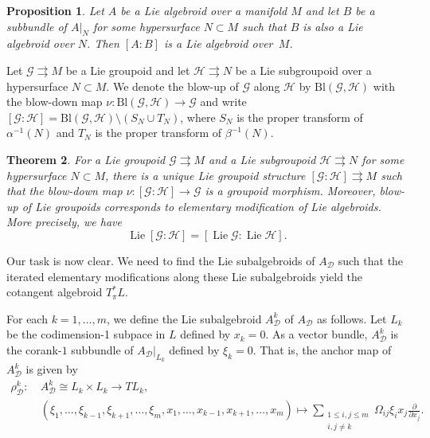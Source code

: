 \documentclass{amsart}
\newtheorem{theorem}{Theorem}[section]
\newtheorem{proposition}[theorem]{Proposition}
\numberwithin{equation}{section}
\newcommand{\cD}{\mathcal{D}}
\newcommand{\cG}{\mathcal{G}}
\newcommand{\cH}{\mathcal{H}}
\newcommand{\Lie}{\operatorname{Lie}}
\newcommand{\rra}{\rightrightarrows}
\begin{document}
\begin{proposition} 
  \cite{GL14}
  Let $A$ be a Lie algebroid over a manifold $M$ and let $B$ be a subbundle of $A|_N$ for some hypersurface $N\subset M$ such that $B$ is also a Lie algebroid over $N$.
  Then $[A\!:\!B]$ is a Lie algebroid over~$M$.
\end{proposition}

Let $\cG \rra M$ be a Lie groupoid and let $\cH \rra N$ be a Lie subgroupoid over a hypersurface $N\subset M$.
We denote the blow-up of $\cG$ along $\cH$ by $\mathrm{Bl}(\cG, \cH)$ with the blow-down map $\nu: \mathrm{Bl}(\cG, \cH) \to \cG$ and write $[\cG\!:\!\cH] = \mathrm{Bl}(\cG, \cH) \setminus (S_N \cup T_N)$, where $S_N$ is the proper transform of $\alpha^{-1}(N)$ and $T_N$ is the proper transform of $\beta^{-1}(N)$.

\begin{theorem} 
  \cite{GL14}
  For a Lie groupoid $\cG \rra M$ and a Lie subgroupoid $\cH \rra N$ for some hypersurface $N\subset M$, there is a unique Lie groupoid structure $[\cG\!:\!\cH] \rra M$ such that the blow-down map $\nu: [\cG\!:\!\cH] \to \cG$ is a groupoid morphism.
  Moreover, blow-up of Lie groupoids corresponds to elementary modification of Lie algebroids.
  More precisely, we have
  \[\Lie[\cG\!:\!\cH] = [\Lie\cG\!:\!\Lie\cH].\]
\end{theorem}

Our task is now clear.
We need to find the Lie subalgebroids of $A_\cD$ such that the iterated elementary modifications along these Lie subalgebroids yield the cotangent algebroid $T^*_\pi L$.

For each $k = 1, \ldots, m$, we define the Lie subalgebroid $A_\cD^k$ of $A_\cD$ as follows.
Let $L_k$ be the codimension-1 subpace in $L$ defined by $x_k = 0$.
As a vector bundle, $A_\cD^k$ is the corank-$1$ subbundle of $A_\cD |_{L_k}$ defined by $\xi_k = 0$.
That is, the anchor map of $A_\cD^k$ is given by
\begin{align*}
  \rho_\cD^k: ~& A_\cD^k \cong L_k\times L_k \to TL_k, \\
  & (\xi_1, \ldots, \xi_{k-1}, \xi_{k+1}, \ldots, \xi_m, x_1, \ldots, x_{k-1}, x_{k+1}, \ldots, x_m) \mapsto \sum_{\substack{1\le i,j \le m\\ i,j\ne k}} \Omega_{ij}\xi_i x_j\frac{\partial}{\partial x_j}.
\end{align*}
\end{document}
